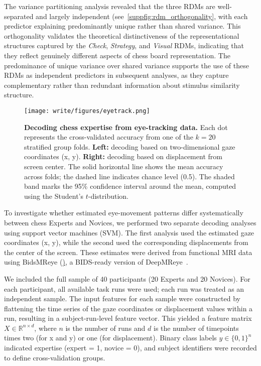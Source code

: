 The variance partitioning analysis revealed that the three RDMs are well-separated and largely independent (see~\ref{suppfig:rdm_orthogonality}, with each predictor explaining predominantly unique rather than shared variance. This orthogonality validates the theoretical distinctiveness of the representational structures captured by the \textit{Check}, \textit{Strategy}, and \textit{Visual} RDMs, indicating that they reflect genuinely different aspects of chess board representation. The predominance of unique variance over shared variance supports the use of these RDMs as independent predictors in subsequent analyses, as they capture complementary rather than redundant information about stimulus similarity structure.

\begin{figure}[!htp]
 \centering
 \texttt{[image: write/figures/eyetrack.png]}
   \caption{\textbf{Decoding chess expertise from eye-tracking data.} Each dot represents the cross-validated accuracy from one of the $k=20$ stratified group folds. \textbf{Left:} decoding based on two-dimensional gaze coordinates (x, y). \textbf{Right:} decoding based on displacement from screen center. The solid horizontal line shows the mean accuracy across folds; the dashed line indicates chance level (0.5). The shaded band marks the 95\% confidence interval around the mean, computed using the Student's $t$-distribution.}
 \label{suppfig:eyetrack_results}
\end{figure}


To investigate whether estimated eye-movement patterns differ systematically between chess Experts and Novices, we performed two separate decoding analyses using support vector machines (SVM). The first analysis used the estimated gaze coordinates (x, y), while the second used the corresponding displacements from the center of the screen. These estimates were derived from functional MRI data using BidsMReye (\href{https://github.com/cpp-lln-lab/bidsMReye}), a BIDS-ready version of DeepMReye~\cite{frey2021magnetic}.

We included the full sample of 40 participants (20 Experts and 20 Novices). For each participant, all available task runs were used; each run was treated as an independent sample. The input features for each sample were constructed by flattening the time series of the gaze coordinates or displacement values within a run, resulting in a subject-run-level feature vector. This yielded a feature matrix $X \in \mathbb{R}^{n \times d}$, where $n$ is the number of runs and $d$ is the number of timepoints times two (for x and y) or one (for displacement). Binary class labels $y \in \{0, 1\}^n$ indicated expertise (expert = 1, novice = 0), and subject identifiers were recorded to define cross-validation groups.

